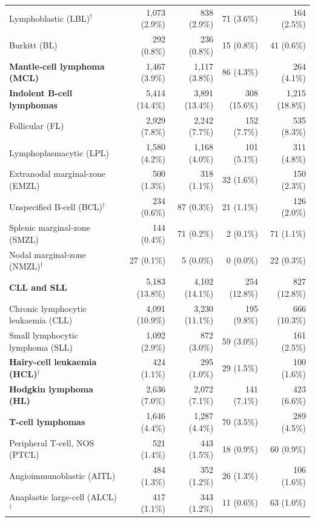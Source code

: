 \begin{table}[p]
\begin{tabularx}{\textwidth}{@{}Xrrrr@{}}
\qquad Lymphoblastic (LBL)$^{\dagger}$ & 1,073 (2.9\%) & 838 (2.9\%) & 71 (3.6\%) & 164 (2.5\%) \\
\qquad Burkitt (BL) & 292 (0.8\%) & 236 (0.8\%) & 15 (0.8\%) & 41 (0.6\%) \\
\quad \textbf{Mantle-cell lymphoma (MCL)} & 1,467 (3.9\%) & 1,117 (3.8\%) & 86 (4.3\%) & 264 (4.1\%) \\
\quad \textbf{Indolent B-cell lymphomas} & 5,414 (14.4\%) & 3,891 (13.4\%) & 308 (15.6\%) & 1,215 (18.8\%) \\
\qquad Follicular (FL) & 2,929 (7.8\%) & 2,242 (7.7\%) & 152 (7.7\%) & 535 (8.3\%) \\
\qquad Lymphoplasmacytic (LPL) & 1,580 (4.2\%) & 1,168 (4.0\%) & 101 (5.1\%) & 311 (4.8\%) \\
\qquad Extranodal marginal-zone (EMZL) & 500 (1.3\%) & 318 (1.1\%) & 32 (1.6\%) & 150 (2.3\%) \\
\qquad Unspecified B-cell (BCL)$^{\dagger}$ & 234 (0.6\%) & 87 (0.3\%) & 21 (1.1\%) & 126 (2.0\%) \\
\qquad Splenic marginal-zone (SMZL) & 144 (0.4\%) & 71 (0.2\%) & 2 (0.1\%) & 71 (1.1\%) \\
\qquad Nodal marginal-zone (NMZL)$^{\dagger}$ & 27 (0.1\%) & 5 (0.0\%) & 0 (0.0\%) & 22 (0.3\%) \\
\quad \textbf{CLL and SLL} & 5,183 (13.8\%) & 4,102 (14.1\%) & 254 (12.8\%) & 827 (12.8\%) \\
\qquad Chronic lymphocytic leukaemia (CLL) & 4,091 (10.9\%) & 3,230 (11.1\%) & 195 (9.8\%) & 666 (10.3\%) \\
\qquad Small lymphocytic lymphoma (SLL) & 1,092 (2.9\%) & 872 (3.0\%) & 59 (3.0\%) & 161 (2.5\%) \\
\quad \textbf{Hairy-cell leukaemia (HCL)$^{\dagger}$} & 424 (1.1\%) & 295 (1.0\%) & 29 (1.5\%) & 100 (1.6\%) \\
\quad \textbf{Hodgkin lymphoma (HL)} & 2,636 (7.0\%) & 2,072 (7.1\%) & 141 (7.1\%) & 423 (6.6\%) \\
\quad \textbf{T-cell lymphomas} & 1,646 (4.4\%) & 1,287 (4.4\%) & 70 (3.5\%) & 289 (4.5\%) \\
\qquad Peripheral T-cell, NOS (PTCL) & 521 (1.4\%) & 443 (1.5\%) & 18 (0.9\%) & 60 (0.9\%) \\
\qquad Angioimmunoblastic (AITL) & 484 (1.3\%) & 352 (1.2\%) & 26 (1.3\%) & 106 (1.6\%) \\
\qquad Anaplastic large-cell (ALCL)$^{\dagger}$ & 417 (1.1\%) & 343 (1.2\%) & 11 (0.6\%) & 63 (1.0\%) \\

\end{tabularx}
\end{table}
